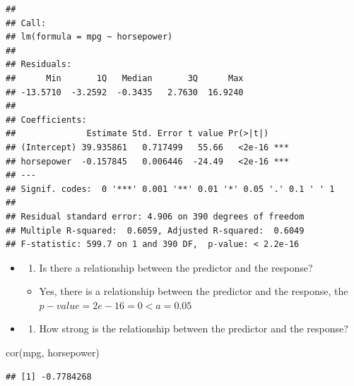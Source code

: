 \documentclass[
]{article}
\newenvironment{Shaded}{\begin{snugshade}}{\end{snugshade}}
\newcommand{\FunctionTok}[1]{\textcolor[rgb]{0.00,0.00,0.00}{#1}}
\newcommand{\NormalTok}[1]{#1}
\providecommand{\tightlist}{%
  \setlength{\itemsep}{0pt}\setlength{\parskip}{0pt}}
\begin{document}
\begin{verbatim}
## 
## Call:
## lm(formula = mpg ~ horsepower)
## 
## Residuals:
##      Min       1Q   Median       3Q      Max 
## -13.5710  -3.2592  -0.3435   2.7630  16.9240 
## 
## Coefficients:
##              Estimate Std. Error t value Pr(>|t|)    
## (Intercept) 39.935861   0.717499   55.66   <2e-16 ***
## horsepower  -0.157845   0.006446  -24.49   <2e-16 ***
## ---
## Signif. codes:  0 '***' 0.001 '**' 0.01 '*' 0.05 '.' 0.1 ' ' 1
## 
## Residual standard error: 4.906 on 390 degrees of freedom
## Multiple R-squared:  0.6059, Adjusted R-squared:  0.6049 
## F-statistic: 599.7 on 1 and 390 DF,  p-value: < 2.2e-16
\end{verbatim}

\begin{itemize}
\item
  \begin{enumerate}
  \def\labelenumi{\roman{enumi}.}
  \tightlist
  \item
    Is there a relationship between the predictor and the response?
  \end{enumerate}

  \begin{itemize}
  \tightlist
  \item
    Yes, there is a relationship between the predictor and the response,
    the \(p-value = 2e-16 = 0 < {a = 0.05}\)
  \end{itemize}
\item
  \begin{enumerate}
  \def\labelenumi{\roman{enumi}.}
  \setcounter{enumi}{1}
  \tightlist
  \item
    How strong is the relationship between the predictor and the
    response?
  \end{enumerate}
\end{itemize}

\begin{Shaded}
\begin{Highlighting}[]
\FunctionTok{cor}\NormalTok{(mpg, horsepower)}
\end{Highlighting}
\end{Shaded}

\begin{verbatim}
## [1] -0.7784268
\end{verbatim}
\end{document}
